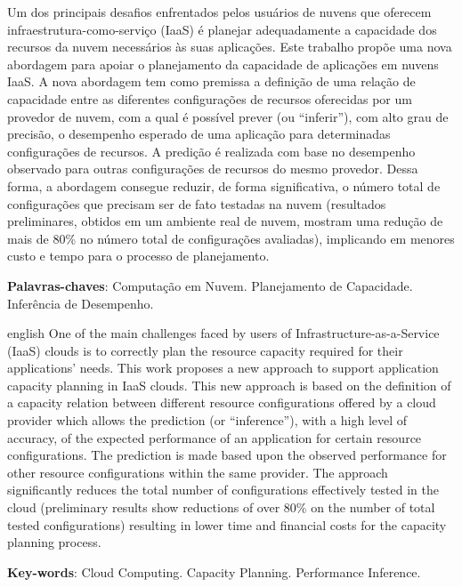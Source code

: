 \setlength{\absparsep}{18pt} %
\begin{resumo}
Um dos principais desafios enfrentados pelos usuários de nuvens que oferecem 
infraestrutura-como-serviço (IaaS) é planejar adequadamente a capacidade dos 
recursos da nuvem necessários às suas aplicações. Este trabalho propõe uma nova 
abordagem para apoiar o planejamento da capacidade de aplicações em nuvens IaaS. 
A nova abordagem tem como premissa a definição de uma relação de capacidade 
entre as diferentes configurações de recursos oferecidas por um provedor de nuvem, 
com a qual é possível prever (ou ``inferir''), com alto grau de precisão, o 
desempenho esperado de uma aplicação para determinadas configurações de recursos. 
A predição é realizada com base no desempenho observado para outras configurações 
de recursos do mesmo provedor. Dessa forma, a abordagem consegue reduzir, de 
forma significativa, o número total de configurações que precisam ser de fato 
testadas na nuvem (resultados preliminares, obtidos em um ambiente real de nuvem, 
mostram uma redução de mais de 80\% no número total de configurações avaliadas), 
implicando em menores custo e tempo para o processo de planejamento.

 \textbf{Palavras-chaves}: Computação em Nuvem. Planejamento de Capacidade. Inferência de Desempenho.
\end{resumo}

\begin{resumo}[Abstract]
 \begin{otherlanguage*}{english}
One of the main challenges faced by users of Infrastructure-as-a-Service (IaaS) 
clouds is to correctly plan the resource capacity required for their applications'
needs. This work proposes a new approach to support application capacity planning 
in IaaS clouds. This new approach is based on the definition of a capacity relation 
between different resource configurations offered by a cloud provider which allows 
the prediction (or ``inference''), with a high level of accuracy, of the expected performance 
of an application for certain resource configurations. The prediction is made based
upon the observed performance for other resource configurations within the same 
provider. The approach significantly reduces the total number of configurations 
effectively tested in the cloud (preliminary results show reductions of over 80\% 
on the number of total tested configurations) resulting in lower time and financial costs  
for the capacity planning process.

   \vspace{\onelineskip}
 
   \noindent 
   \textbf{Key-words}: Cloud Computing. Capacity Planning. Performance Inference.
 \end{otherlanguage*}
\end{resumo}
